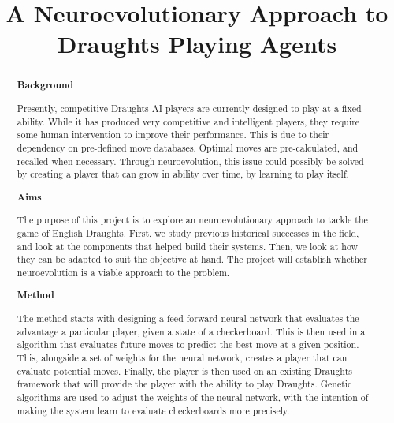 \documentclass[12pt,a4paper]{article}
\title{A Neuroevolutionary Approach to Draughts Playing Agents}
\author{}
\date{}
\begin{document}
    \maketitle


\begin{abstract}


    {\bf Background}

    Presently, competitive Draughts AI players are currently designed to play at a fixed ability. While it has produced very competitive and intelligent players, they require some human intervention to improve their performance. 
    This is due to their dependency on pre-defined move databases. Optimal moves are pre-calculated, and recalled when necessary. Through neuroevolution, this issue could possibly be solved by creating a player that can grow in ability over time, by learning to play itself.
    
    {\bf Aims}

    The purpose of this project is to explore an neuroevolutionary approach to tackle the game of English Draughts. First, we study previous historical successes in the field, and look at the components that helped build their systems. Then, we look at how they can be adapted to suit the objective at hand. The project will establish whether neuroevolution is a viable approach to the problem.
    
    {\bf Method}


    The method starts with designing a feed-forward neural network that evaluates the advantage a particular player, given a state of a checkerboard. This is then used in a algorithm that evaluates future moves to predict the best move at a given position. This, alongside a set of weights for the neural network, creates a player that can evaluate potential moves. Finally, the player is then used on an existing Draughts framework that will provide the player with the ability to play Draughts. Genetic algorithms are used to adjust the weights of the neural network, with the intention of making the system learn to evaluate checkerboards more precisely.


\end{abstract}
\end{document}
